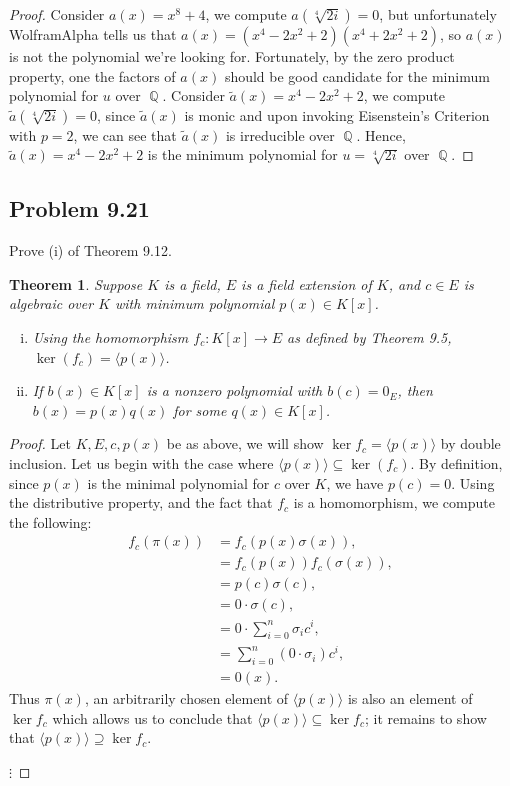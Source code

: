 \documentclass[letterpaper, 12pt]{amsart}
\DeclareMathOperator{\Q}{\mathbb{Q}}
\newcommand{\pid}[1]{\langle #1 \rangle}
\newtheorem{thm}{Theorem}[section]
\theoremstyle{definition}  %
\begin{document}
		\begin{proof}
		Consider $a(x) = x^{8} + 4$, we compute $a(\sqrt[4]{2i}) = 0$, but unfortunately WolframAlpha tells us that $a(x) = (x^{4} - 2x^{2} + 2)(x^{4} + 2x^{2} + 2)$, so $a(x)$ is not the polynomial we're looking for.
		Fortunately, by the zero product property, one the factors of $a(x)$ should be good candidate for the minimum polynomial for $u$ over $\Q$.
		Consider $\tilde{a}(x) = x^{4} - 2x^{2} + 2$, we compute $\tilde{a}(\sqrt[4]{2i}) = 0$, since $\tilde{a}(x)$ is monic and upon invoking Eisenstein's Criterion with $p = 2$, we can see that $\tilde{a}(x)$ is irreducible over $\Q$.
		Hence, $\tilde{a}(x) = x^{4} - 2x^{2} + 2$ is the minimum polynomial for $u = \sqrt[4]{2i}$ over $\Q$.
		\end{proof}

	\subsection*{Problem 9.21}
	\label{sub:problem_9_21}
	Prove (i) of Theorem 9.12.
		\setcounter{section}{9}
		\setcounter{subsection}{12}
		\setcounter{thm}{11}
		\begin{thm}
		Suppose $K$ is a field, $E$ is a field extension of $K$, and $c \in E$ is algebraic over $K$ with minimum polynomial $p(x) \in K[x]$.
			\begin{enumerate}[(i)]
				\item Using the homomorphism $f_{c}: K[x] \to E$ as defined by Theorem 9.5, $\ker{(f_{c})} = \pid{p(x)}$.
				\item If $b(x) \in K[x]$ is a nonzero polynomial with $b(c) = 0_{E}$, then $b(x) = p(x)q(x)$ for some $q(x) \in K[x]$.
			\end{enumerate}
		\end{thm}

		\begin{proof}
		Let $K,E,c,p(x)$ be as above, we will show $\ker{f_{c}} = \pid{p(x)}$ by double inclusion.
		Let us begin with the case where $\pid{p(x)} \subseteq \ker{(f_{c})}$.
		By definition, since $p(x)$ is the minimal polynomial for $c$ over $K$, we have $p(c) = 0$.
		Using the distributive property, and the fact that $f_{c}$ is a homomorphism, we compute the following:
			\begin{align*}
			f_{c}(\pi(x)) &= f_{c}(p(x)\sigma(x)), \\
			&= f_{c}(p(x))f_{c}(\sigma(x)), \\
			&= p(c) \sigma(c), \\
			&= 0 \cdot \sigma(c), \\
			&= 0 \cdot \sum\limits_{i=0}^{n} \sigma_{i}c^{i}, \\
			&= \sum\limits_{i=0}^{n} (0 \cdot \sigma_{i}) c^{i}, \\
			&= 0(x).
			\end{align*}
		Thus $\pi(x)$, an arbitrarily chosen element of $\pid{p(x)}$ is also an element of $\ker{f_{c}}$ which allows us to conclude that $\pid{p(x)} \subseteq \ker{f_{c}}$; it remains to show that $\pid{p(x)} \supseteq \ker{f_{c}}$.
		
		$\vdots$
		\end{proof}
\end{document}
